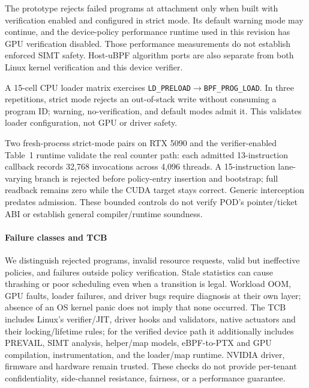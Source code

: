 The prototype rejects failed programs at attachment only when built with verification enabled and configured in strict mode. Its default warning mode may continue, and the device-policy performance runtime used in this revision has GPU verification disabled. Those performance measurements do not establish enforced SIMT safety. Host-uBPF algorithm ports are also separate from both Linux kernel verification and this device verifier.

A 15-cell CPU loader matrix exercises \texttt{LD\_PRELOAD}$\rightarrow$\texttt{BPF\_PROG\_LOAD}. In three repetitions, strict mode rejects an out-of-stack write without consuming a program ID; warning, no-verification, and default modes admit it. This validates loader configuration, not GPU or driver safety.

Two fresh-process strict-mode pairs on RTX 5090 and the verifier-enabled Table~1
runtime validate the real counter path: each admitted 13-instruction callback
records 32,768 invocations across 4,096 threads. A 15-instruction lane-varying
branch is rejected before policy-entry insertion and bootstrap; full readback
remains zero while the CUDA target stays correct. Generic interception predates
admission.
These bounded controls do not verify POD's pointer/ticket ABI or establish
general compiler/runtime soundness.


\paragraph{Failure classes and TCB}
We distinguish rejected programs, invalid resource requests, valid but ineffective policies, and failures outside policy verification. Stale statistics can cause thrashing or poor scheduling even when a transition is legal. Workload OOM, GPU faults, loader failures, and driver bugs require diagnosis at their own layer; absence of an OS kernel panic does not imply that none occurred. The TCB includes Linux's verifier/JIT, driver hooks and validators, native actuators and their locking/lifetime rules; for the verified device path it additionally includes PREVAIL, SIMT analysis, helper/map models, eBPF-to-PTX and GPU compilation, instrumentation, and the loader/map runtime. NVIDIA driver, firmware and hardware remain trusted. These checks do not provide per-tenant confidentiality, side-channel resistance, fairness, or a performance guarantee.
